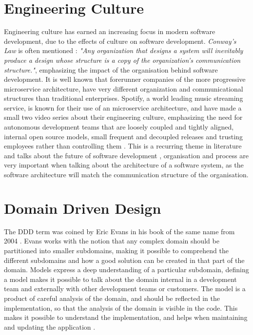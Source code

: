 \section{Engineering Culture}
Engineering culture has earned an increasing focus in modern software development, due to the effects of culture on software development. \textit{Conway's Law} is often mentioned \cite{newman2014demystifying}: \textit{ "Any organization that designs a system will inevitably produce a design whose structure is a copy of the organization's communication structure."}, emphasizing the impact of the organisation behind software development. It is well known that forerunner companies of the more progressive microservice architecture, have very different organization and communicational structures than traditional enterprises. Spotify, a world leading music streaming service, is known for their use of an microservice architecture, and have made a small two video series about their engineering culture, emphasizing the need for autonomous development teams that are loosely coupled and tightly aligned, internal open source models, small frequent and decoupled releases and trusting employees rather than controlling them  \cite{kniberg2014spotify}. This is a recurring theme in literature and talks about the future of software development \cite[p.~5]{nygard2007release} \cite[p.13]{newman2015microservices} \cite[t.~34:32]{george2016it} \cite{fowler2014microservices} \cite[t.~25:30]{fowler2014microservicesoamonolith}, organisation and process are very important when talking about the architecture of a software system, as the software architecture will match the communication structure of the organisation.


\section{Domain Driven Design}
\label{sec:DDD}
The DDD term was coined by Eric Evans in his book of the same name from 2004 \cite[preface]{evans2004domain}. Evans works with the notion that any complex domain should be partitioned into smaller subdomains, making it possible to comprehend the different subdomains and how a good solution can be created in that part of the domain. Models express a deep understanding of a particular subdomain, defining a model makes it possible to talk about the domain internal in a development team and externally with other development teams or customers. The model is a product of careful analysis of the domain, and should be reflected in the implementation, so that the analysis of the domain is visible in the code. This makes it possible to understand the implementation, and helps when maintaining and updating the application \cite[p.~2]{evans2004domain}.


